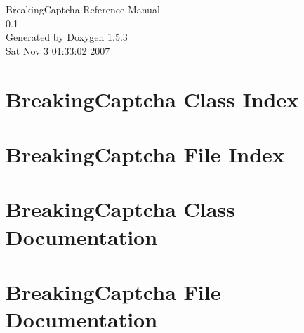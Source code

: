\documentclass[a4paper]{book}
\begin{document}
\begin{titlepage}
\vspace*{7cm}
\begin{center}
{\Large BreakingCaptcha Reference Manual\\[1ex]\large 0.1 }\\
\vspace*{1cm}
{\large Generated by Doxygen 1.5.3}\\
\vspace*{0.5cm}
{\small Sat Nov 3 01:33:02 2007}\\
\end{center}
\end{titlepage}
\clearemptydoublepage
{}
\tableofcontents
\clearemptydoublepage
{}
\chapter{BreakingCaptcha Class Index}

\chapter{BreakingCaptcha File Index}

\chapter{BreakingCaptcha Class Documentation}



\chapter{BreakingCaptcha File Documentation}






\printindex
\end{document}

